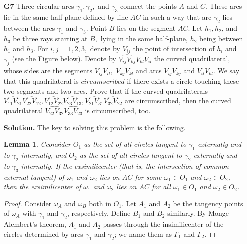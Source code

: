 \documentclass[11pt]{article}
\newcommand{\<}{\langle}
\renewcommand{\>}{\rangle}
\newtheorem{lemma}{Lemma}
\begin{document}
\begin{enumerate}
	\item [\textbf{G7}] Three circular arcs $\gamma_1, \gamma_2,$ and $\gamma_3$ connect the points $A$ and $C.$ These arcs lie in the same half-plane defined by line $AC$ in such a way that arc $\gamma_2$ lies between the arcs $\gamma_1$ and $\gamma_3.$ Point $B$ lies on the segment $AC.$ Let $h_1, h_2$, and $h_3$ be three rays starting at $B,$ lying in the same half-plane, $h_2$ being between $h_1$ and $h_3.$ For $i, j = 1, 2, 3,$ denote by $V_{ij}$ the point of intersection of $h_i$ and $\gamma_j$ (see the Figure below). Denote by $\widehat{V_{ij}V_{kj}}\widehat{V_{kl}V_{il}}$ the curved quadrilateral, whose sides are the segments $V_{ij}V_{il},$ $V_{kj}V_{kl}$ and arcs $V_{ij}V_{kj}$ and $V_{il}V_{kl}.$ We say that this quadrilateral is $circumscribed$ if there exists a circle touching these two segments and two arcs. Prove that if the curved quadrilaterals $\widehat{V_{11}V_{21}}\widehat{V_{22}V_{12}}, \widehat{V_{12}V_{22}}\widehat{V_{23}V_{13}},\widehat{V_{21}V_{31}}\widehat{V_{32}V_{22}}$ are circumscribed, then the curved quadrilateral $\widehat{V_{22}V_{32}}\widehat{V_{33}V_{23}}$ is circumscribed, too.
	
	\textbf{Solution.} 
	The key to solving this problem is the following. 
	\begin{lemma}
		Cconsider $O_1$ as the set of all circles tangent to $\gamma_1$ externally and to $\gamma_2$ internally, and $O_2$ as the set of all circles tangent to $\gamma_2$ externally and to $\gamma_3$ internally. If the exsimilicenter (that is, the intersection of common external tangent) of $\omega_1$ and $\omega_2$ lies on $AC$ for \emph{some} $\omega_1\in O_1$ and $\omega_2\in O_2$, then the exsimilicenter of $\omega_1$ and $\omega_2$ lies on $AC$ for \emph{all} $\omega_1\in O_1$ and $\omega_2\in O_2$. 
	\end{lemma}
    
    \begin{proof}
    	Consider $\omega_A$ and $\omega_B$ both in $O_1$. Let $A_1$ and $A_2$ be the tangency points of $\omega_A$ with $\gamma_1$ and $\gamma_2$, respectively. Define $B_1$ and $B_2$ similarly. By Monge Alembert's theorem, $A_1$ and $A_2$ passes through the insimilicenter of the circles determined by arcs $\gamma_1$ and $\gamma_2$; we name them as $\Gamma_1$ and $\Gamma_2$. 
    	

\end{proof}
\end{enumerate}
\end{document}

